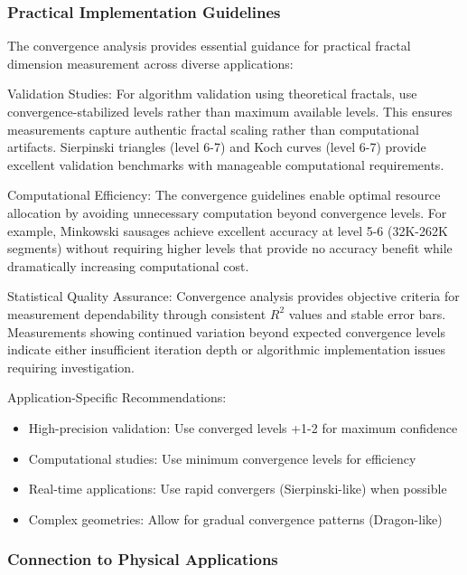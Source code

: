 \documentclass[preprint,12pt]{elsarticle}
\def\textbf#1{#1}%
\begin{document}
\subsubsection{Practical Implementation Guidelines}

The convergence analysis provides essential guidance for practical fractal dimension measurement across diverse applications:

\textbf{Validation Studies}: For algorithm validation using theoretical fractals, use convergence-stabilized levels rather than maximum available levels. This ensures measurements capture authentic fractal scaling rather than computational artifacts. Sierpinski triangles (level 6-7) and Koch curves (level 6-7) provide excellent validation benchmarks with manageable computational requirements.

\textbf{Computational Efficiency}: The convergence guidelines enable optimal resource allocation by avoiding unnecessary computation beyond convergence levels. For example, Minkowski sausages achieve excellent accuracy at level 5-6 (32K-262K segments) without requiring higher levels that provide no accuracy benefit while dramatically increasing computational cost.

\textbf{Statistical Quality Assurance}: Convergence analysis provides objective criteria for measurement dependability through consistent $R^2$ values and stable error bars. Measurements showing continued variation beyond expected convergence levels indicate either insufficient iteration depth or algorithmic implementation issues requiring investigation.

\textbf{Application-Specific Recommendations}:
\begin{itemize}
\item \textbf{High-precision validation}: Use converged levels +1-2 for maximum confidence
\item \textbf{Computational studies}: Use minimum convergence levels for efficiency
\item \textbf{Real-time applications}: Use rapid convergers (Sierpinski-like) when possible
\item \textbf{Complex geometries}: Allow for gradual convergence patterns (Dragon-like)
\end{itemize}

\subsubsection{Connection to Physical Applications}
\end{document}
